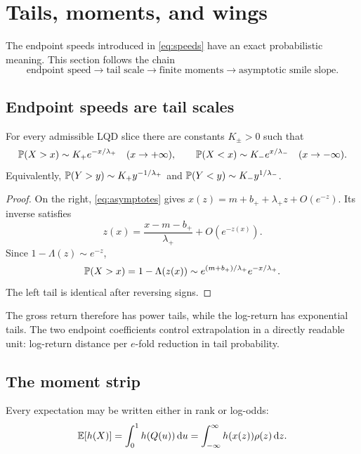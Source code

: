 \section{Tails, moments, and wings}
\label{sec:tails}

The endpoint speeds introduced in \eqref{eq:speeds} have an exact
probabilistic meaning.  This section follows the chain
\[
\text{endpoint speed}\longrightarrow
\text{tail scale}\longrightarrow
\text{finite moments}\longrightarrow
\text{asymptotic smile slope}.
\]

\subsection{Endpoint speeds are tail scales}

\begin{proposition}
\label{prop:tails}
For every admissible LQD slice there are constants $K_\pm>0$ such that
\begin{equation}
\mathbb{P}(X>x)\sim K_+e^{-x/\lambda_+}\quad(x\to+\infty),
\qquad
\mathbb{P}(X<x)\sim K_-e^{x/\lambda_-}\quad(x\to-\infty).
\label{eq:exptails}
\end{equation}
Equivalently,
$\mathbb{P}(Y>y)\sim K_+y^{-1/\lambda_+}$ and
$\mathbb{P}(Y<y)\sim K_-y^{1/\lambda_-}$.
\end{proposition}

\begin{proof}
On the right, \eqref{eq:asymptotes} gives
$x(z)=m+b_++\lambda_+z+O(e^{-z})$.  Its inverse satisfies
\[
z(x)=\frac{x-m-b_+}{\lambda_+}+O(e^{-z(x)}).
\]
Since $1-\Lambda(z)\sim e^{-z}$,
\[
\mathbb{P}(X>x)=1-\Lambda(z(x))
\sim e^{(m+b_+)/\lambda_+}e^{-x/\lambda_+}.
\]
The left tail is identical after reversing signs.
\end{proof}

The gross return therefore has power tails, while the log-return has
exponential tails.  The two endpoint coefficients control extrapolation in a
directly readable unit: log-return distance per $e$-fold reduction in tail
probability.

\subsection{The moment strip}

Every expectation may be written either in rank or log-odds:
\begin{equation}
\mathbb{E}[h(X)]=\int_0^1h(Q(u))\,\mathrm{d} u
=\int_{-\infty}^{\infty}h(x(z))\rho(z)\,\mathrm{d} z.
\label{eq:rankintegral}
\end{equation}


